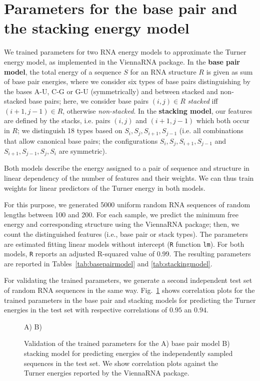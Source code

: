 \documentclass{bioinfo}
\makeatletter
\newlength{\@aligneps}
\newcommand{\includegraphicstop}[2][]{%
\sbox{\@alignepsbox}{\texttt{[image: \#2]}}%
\setlength{\@aligneps}{-\ht\@alignepsbox}%
\addtolength{\@aligneps}{2ex}%
\raisebox{\@aligneps}{\usebox{\@alignepsbox}}}
\newcommand{\Def}[1]{{\bfseries #1}}
\newcommand{\Software}[1]{{\ttfamily #1}}
\makeatother
\begin{document}
\section{Parameters for the base pair and the stacking energy model}
\label{appsec:modelparameters}

We trained parameters for two RNA energy models to approximate the
Turner energy model, as implemented in the \Software{ViennaRNA}
package.  In the \Def{base pair model}, the total energy of a sequence $S$
for an RNA structure $R$ is given as sum of base pair energies, where
we consider six types of base pairs distinguishing by the bases A-U,
C-G or G-U (symmetrically) and between stacked and non-stacked base
pairs; here, we consider base pairs $(i,j)\in R$ \emph{stacked} iff
$(i+1,j-1)\in R$, otherwise \emph{non-stacked}. In the \Def{stacking model},
our features are defined by the stacks, i.e. pairs $(i,j)$ and
$(i+1,j-1)$ which both occur in $R$; we distinguish 18 types based on
$S_i,S_j,S_{i+1},S_{j-1}$ (i.e. all combinations that allow canonical
base pairs; the configurations $S_i,S_j,S_{i+1},S_{j-1}$ and
$S_{i+1},S_{j-1},S_j,S_i$ are symmetric).

Both models describe the energy assigned to a pair of sequence and
structure in linear dependency of the number of features and their
weights. We can thus train weights for linear predictors of the Turner
energy in both models.

For this purpose, we generated 5000 uniform random RNA sequences of
random lengths between 100 and 200. For each sample, we predict the
minimum free energy and corresponding structure using the ViennaRNA
package; then, we count the distinguished features (i.e., base pair or
stack types). The parameters are estimated fitting linear models
without intercept (\texttt{R} function \texttt{lm}). For both models,
\texttt{R} reports an adjusted R-squared value of 0.99. The resulting
parameters are reported in Tables~\ref{tab:basepairmodel} and
\ref{tab:stackingmodel}.

For validating the trained parameters, we generate a second
independent test set of random RNA sequences in the same
way. Fig.~\ref{fig:training-cor} shows correlation plots for the
trained parameters in the base pair and stacking models for predicting
the Turner energies in the test set with respective correlations of
$0.95$ an $0.94$.

\begin{figure}
  \centering
  A)\includegraphicstop[width=0.4\textwidth,trim=0 0 0 50,clip]{Figs/basepaircor}
  B)\includegraphicstop[width=0.4\textwidth,trim=0 0 0 50,clip]{Figs/stackingcor}
  \caption{Validation of the trained parameters for the A) base pair
    model B) stacking model for predicting energies of the
    independently sampled sequences in the test set. We show
    correlation plots against the Turner energies reported by the
    ViennaRNA package.}
  \label{fig:training-cor}
\end{figure}
\end{document}
